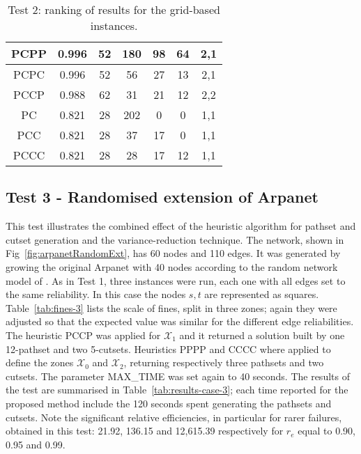 \documentclass[a4paper]{article}
\begin{document}
\begin{table}
\begin{center}
\begin{tabular}{ | c | c | c | c | c | c | c | }
PCPP & 0.996 & 52 & 180 & 98 & 64 & 2,1 \\ \hline
PCPC & 0.996 & 52 & 56 & 27 & 13 & 2,1 \\ \hline
PCCP & 0.988 & 62 & 31 & 21 & 12 & 2,2 \\ \hline
PC & 0.821 & 28 & 202 & 0 & 0 & 1,1 \\ \hline
PCC & 0.821 & 28 & 37 & 17 & 0 & 1,1 \\ \hline
PCCC & 0.821 & 28 & 28 & 17 & 12 & 1,1 \\ \hline
\end{tabular}
\end{center}
\caption{Test 2: ranking of results for the grid-based instances.}
\label{tab:testSqGridsResults}
\end{table}






\subsection{Test 3 - Randomised extension of Arpanet}

This test illustrates the combined effect of the heuristic algorithm for pathset and cutset generation and the variance-reduction technique. The network, shown in Fig~\ref{fig:arpanetRandomExt}, has 60 nodes and 110 edges. It was generated by growing the original Arpanet with 40 nodes according to the random network model of \cite{AlbertBarabasi2002}. As in Test 1, three instances were run, each one with all edges set to the same reliability. In this case the nodes $s,t$ are represented as squares. Table~\ref{tab:fines-3} lists the scale of fines, split in three zones; again they were adjusted so that the expected value was similar for the different edge reliabilities. The heuristic PCCP was applied for ${\mathcal X}_1$ and it returned a solution built by one 12-pathset and two 5-cutsets. Heuristics PPPP and CCCC where applied to define the zones ${\mathcal X}_0$ and ${\mathcal X}_2$, returning respectively three pathsets and two cutsets. The parameter MAX\_TIME was set again to 40 seconds. The results of the test are summarised in Table~\ref{tab:results-case-3}; each time reported for the proposed method include the 120 seconds spent generating the pathsets and cutsets. Note the significant relative efficiencies, in particular for rarer failures, obtained in this test: 21.92, 136.15 and 12,615.39 respectively for $r_e$ equal to 0.90, 0.95 and 0.99.  
\end{document}
